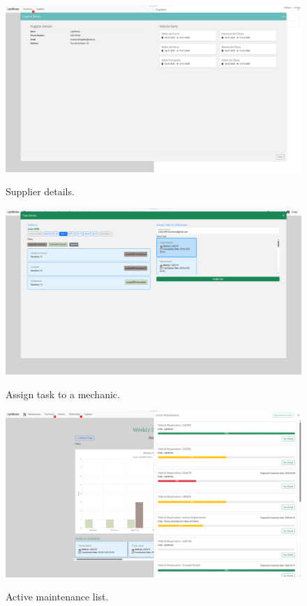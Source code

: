 \begin{figure}[htbp]
  \caption{Supplier details.}
  \centering
  \includegraphics[width=\textwidth]{figs/Implementation/warehouse/supplierDetails}
  \label{fig:supplierDetails}
\end{figure}




\begin{figure}[htbp]
  \caption{Assign task to a mechanic.}
  \centering
  \includegraphics[width=\textwidth]{figs/Implementation/workshopmanager/addTask}
  \label{fig:workshopmanagerAssignTask}
\end{figure}


\begin{figure}[htbp]
  \caption{Active maintenance list.}
  \centering
  \includegraphics[width=\textwidth]{figs/Implementation/workshopmanager/maintenanceList}
  \label{fig:workshopmanagerMaintenanceList}
\end{figure}


